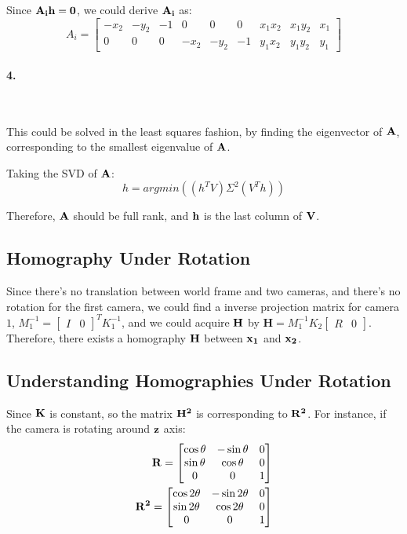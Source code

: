 \documentclass[11pt]{article} \usepackage{fullpage} \usepackage{graphicx} \usepackage{epstopdf} \usepackage{color} \usepackage{psfrag} \usepackage{pdfsync}\usepackage{indentfirst}\usepackage{subfigure}\usepackage{float}\usepackage[section]{placeins}
\begin{document}
Since $\bold{A_ih = 0}$, we could derive $\bold{A_i}$ as:
\begin{equation}
	A_i = 
	\begin{bmatrix}
		-x_2 & -y_2 & -1 & 0 & 0 & 0 & x_1x_2 & x_1y_2 & x_1 \\
		0 & 0 & 0 & -x_2 & -y_2 & -1 & y_1x_2 & y_1y_2 & y_1
	\end{bmatrix}
\end{equation}

\paragraph{4.}~{}

This could be solved in the least squares fashion, by finding the eigenvector of $\bold{A}$, corresponding to the smallest eigenvalue of $\bold{A}$.

Taking the SVD of $\bold{A}$:
\begin{equation}
	h = argmin\left(\left(h^{T}V\right)\Sigma^{2}\left(V^{T}h\right)\right)
\end{equation}

Therefore, $\bold{A}$ should be full rank, and $\bold{h}$ is the last column of $\bold{V}$.

\subsection{Homography Under Rotation}

Since there's no translation between world frame and two cameras, and there's no rotation for the first camera, we could find a inverse projection matrix for camera $1$, $M_1^{-1} = \left[ \begin{smallmatrix} I & 0  \end{smallmatrix} \right]^{T}K_1^{-1}$, and we could acquire $\bold{H}$ by $\boldsymbol{H} = M_1^{-1}K_2\left[ \begin{smallmatrix} R & 0  \end{smallmatrix} \right]$. Therefore, there exists a homography $\bold{H}$ between $\bold{x_1}$ and $\bold{x_2}$.

\subsection{Understanding Homographies Under Rotation}

Since $\bold{K}$ is constant, so the matrix $\bold{H^2}$ is corresponding to $\bold{R^2}$. For instance, if the camera is rotating around $\bold{z}$ axis:
\begin{align}
	\bold{R} = 
	\begin{bmatrix}
		\cos{\theta} & -\sin{\theta} & 0 \\
		\sin{\theta} & \cos{\theta} & 0 \\
		0 & 0 & 1
	\end{bmatrix} \\
	\bold{R^2} = 
	\begin{bmatrix}
		\cos{2\theta} & -\sin{2\theta} & 0 \\
		\sin{2\theta} & \cos{2\theta} & 0 \\
		0 & 0 & 1
	\end{bmatrix}
\end{align}
\end{document}
